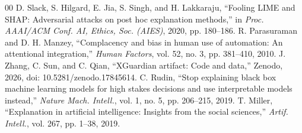 \documentclass[conference]{IEEEtran}
\begin{document}
\begin{thebibliography}{00}
 D. Slack, S. Hilgard, E. Jia, S. Singh, and H. Lakkaraju, ``Fooling LIME and SHAP: Adversarial attacks on post hoc explanation methods,'' in \textit{Proc. AAAI/ACM Conf. AI, Ethics, Soc. (AIES)}, 2020, pp. 180--186.
 R. Parasuraman and D. H. Manzey, ``Complacency and bias in human use of automation: An attentional integration,'' \textit{Human Factors}, vol. 52, no. 3, pp. 381--410, 2010.
 J. Zhang, C. Sun, and C. Qian, ``XGuardian artifact: Code and data,'' Zenodo, 2026, doi: 10.5281/zenodo.17845614.
 C. Rudin, ``Stop explaining black box machine learning models for high stakes decisions and use interpretable models instead,'' \textit{Nature Mach. Intell.}, vol. 1, no. 5, pp. 206--215, 2019.
 T. Miller, ``Explanation in artificial intelligence: Insights from the social sciences,'' \textit{Artif. Intell.}, vol. 267, pp. 1--38, 2019.
\end{thebibliography}
\end{document}
